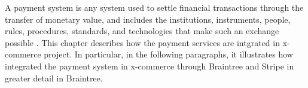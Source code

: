 A payment system is any system used to settle financial transactions through the transfer of monetary value, and includes the institutions, instruments, people, rules, procedures, standards, and technologies that make such an exchange possible \cite{payment_system_wiki}.
\newline
This chapter describes how the payment services are intgrated in x-commerce project. In particular, in the following paragraphs, it illustrates how integrated the payment system in x-commerce through Braintree and Stripe in greater detail in Braintree.